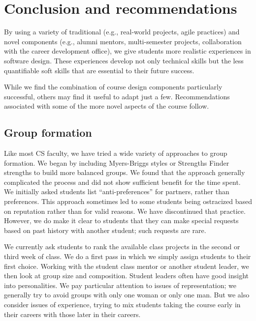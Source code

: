 \section{Conclusion and recommendations}

By using a variety of traditional (e.g., real-world projects, agile
practices) and novel components (e.g., alumni mentors, multi-semester
projects, collaboration with the career development office), we
give students more realistic experiences in software design.  These
experiences develop not only technical skills but the less quantifiable
soft skills that are essential to their future success.

While we find the combination of course design components particularly
successful, others may find it useful to adapt just a few.  Recommendations
associated with some of the more novel aspects of the course follow.

\subsection{Group formation}


Like most CS faculty, we have tried a wide variety of approaches
to group formation.  We began by including Myers-Briggs styles or
Strengths Finder strengths to build more balanced groups.  We found
that the approach generally complicated the process and did not
show sufficient benefit for the time spent.  We initially asked
students list ``anti-preferences'' for partners, rather than
preferences.  This approach sometimes led to some students being
ostracized based on reputation rather than for valid reasons.  We
have discontinued that practice.  However, we do make it clear to
students that they can make special requests based on past history
with another student; such requests are rare.

We currently ask students to rank the available class projects in
the second or third week of class.  We do a first pass in which we
simply assign students to their first choice.  Working with the
student class mentor or another student leader, 
we then look at group size and composition.  Student leaders
often have good insight into personalities.  We pay particular
attention to issues of representation; we generally try to avoid
groups with only one woman or only one man.  But we also consider
issues of experience, trying to mix students taking the course early
in their careers with those later in their careers.

